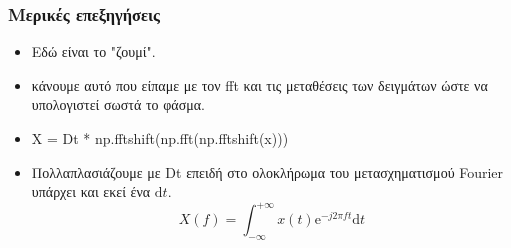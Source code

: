\documentclass[9pt]{beamer}
\begin{document}
	\begin{frame}
	\frametitle{Μερικές επεξηγήσεις}
	
	\begin{itemize}
		\item Εδώ είναι το "ζουμί".
		\item κάνουμε αυτό που είπαμε με τον fft και τις μεταθέσεις των δειγμάτων ώστε να υπολογιστεί σωστά το φάσμα.
		\item Χ = Dt * np.fftshift(np.fft(np.fftshift(x)))
		\item Πολλαπλασιάζουμε με Dt επειδή στο ολοκλήρωμα του μετασχηματισμού Fourier υπάρχει και εκεί ένα $\mathrm{d}t$.
		\begin{equation}
		X(f) = \int_{-\infty}^{+\infty}x(t)\mathrm{e}^{-j2\pi ft}\mathrm{d}t
		\end{equation}	
		
	\end{itemize}
	\end{frame}
\end{document}
